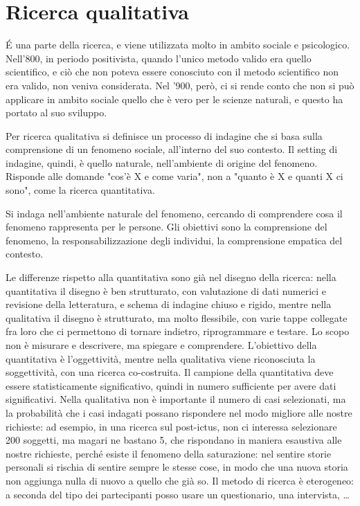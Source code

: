 \chapter{Ricerca qualitativa}
\'E una parte della ricerca, e viene utilizzata molto in ambito sociale e psicologico. Nell'800, in periodo positivista, quando l'unico metodo valido era quello scientifico, e ciò che non poteva essere conosciuto con il metodo scientifico non era valido, non veniva considerata. Nel '900, però, ci si rende conto che non si può applicare in ambito sociale quello che è vero per le scienze naturali, e questo ha portato al suo sviluppo.

Per ricerca qualitativa si definisce un processo di indagine che si basa sulla comprensione di un fenomeno sociale, all'interno del suo contesto. Il setting di indagine, quindi, è quello naturale, nell'ambiente di origine del fenomeno. Risponde alle domande "cos'è X e come varia", non a "quanto è X e quanti X ci sono", come la ricerca quantitativa.

Si indaga nell'ambiente naturale del fenomeno, cercando di comprendere cosa il fenomeno rappresenta per le persone. Gli obiettivi sono la comprensione del fenomeno, la responsabilizzazione degli individui, la comprensione empatica del contesto.

Le differenze rispetto alla quantitativa sono già nel disegno della ricerca: nella quantitativa il disegno è ben strutturato, con valutazione di dati numerici e revisione della letteratura, e schema di indagine chiuso e rigido, mentre nella qualitativa il disegno è strutturato, ma molto flessibile, con varie tappe collegate fra loro che ci permettono di tornare indietro, riprogrammare e testare. Lo scopo non è misurare e descrivere, ma spiegare e comprendere.
L'obiettivo della quantitativa è l'oggettività, mentre nella qualitativa viene riconosciuta la soggettività, con una ricerca co-costruita.
Il campione della quantitativa deve essere statisticamente significativo, quindi in numero sufficiente per avere dati significativi. Nella qualitativa non è importante il numero di casi selezionati, ma la probabilità che i casi indagati possano rispondere nel modo migliore alle nostre richieste: ad esempio, in una ricerca sul post-ictus, non ci interessa selezionare 200 soggetti, ma magari ne bastano 5, che rispondano in maniera esaustiva alle nostre richieste, perché esiste il fenomeno della saturazione: nel sentire storie personali si rischia di sentire sempre le stesse cose, in modo che una nuova storia non aggiunga nulla di nuovo a quello che già so.
Il metodo di ricerca è eterogeneo: a seconda del tipo dei partecipanti posso usare un questionario, una intervista, \dots


